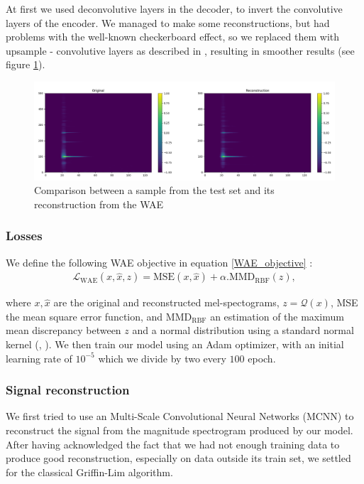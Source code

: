 \documentclass[11pt, english]{article}
\begin{document}
At first we used deconvolutive layers in the decoder, to invert the convolutive layers of the encoder. We managed to make some reconstructions, but had problems with the well-known checkerboard effect, so we replaced them with upsample - convolutive layers as described in \cite{odena2016deconvolution}, resulting in smoother results (see figure \ref{fig:comparison_sample_reconstruction}).

\begin{figure}
    \centering
    \includegraphics[width=\linewidth]{img/compa_finale_specto.png}
    \caption{Comparison between a sample from the test set and its reconstruction from the WAE}
    \label{fig:comparison_sample_reconstruction}
\end{figure}

\subsubsection*{Losses}

We define the following WAE objective in equation \eqref{WAE_objective} :
\begin{align}
\mathcal L_{\text{WAE}}(x, \hat x, z) = \text{MSE}(x,\hat x) + \alpha . \text{MMD}_\text{RBF}(z),
\label{WAE_objective}
\end{align}

where $x, \hat x$ are the original and reconstructed mel-spectograms, $z = \mathcal Q(x)$, MSE the mean square error function, and $\text{MMD}_\text{RBF}$ an estimation of the maximum mean discrepancy between $z$ and a normal distribution using a standard normal kernel (\cite{ref_MMD_1}, \cite{ref_MMD_2}). We then train our model using an Adam optimizer, with an initial learning rate of $10^{-5}$ which we divide by two every $100$ epoch.

\subsubsection*{Signal reconstruction}
We first tried to use an Multi-Scale Convolutional Neural Networks (MCNN) to reconstruct the signal from the magnitude spectrogram produced by our model. After having acknowledged the fact that we had not enough training data to produce good reconstruction, especially on data outside its train set, we settled for the classical Griffin-Lim algorithm\cite{griffin_lim}.
\end{document}
